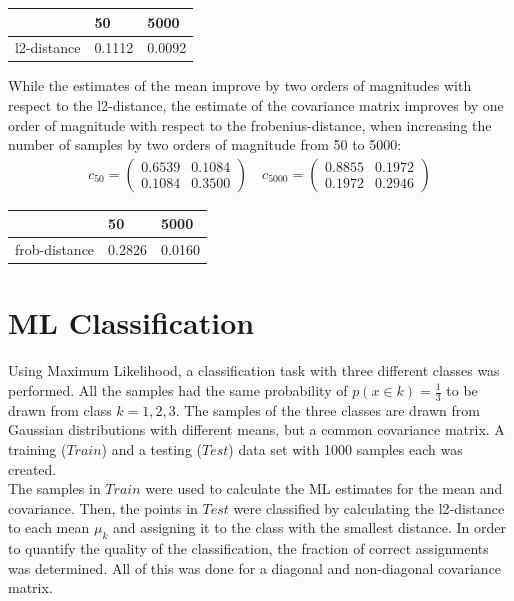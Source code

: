 \documentclass[DIV=12, ngerman, fontsize=12pt, parskip=half]{scrreprt}
\begin{document}
	\begin{table}[H]
	\begin{center}	
		\begin{tabular}{|l|l|l|}
			\hline
			& 50 & 5000 \\
			\hline
			l2-distance & 0.1112   & 0.0092   \\
			\hline
		\end{tabular}
	\end{center}
	\end{table}

	While the estimates of the mean improve by two orders of magnitudes with respect to the l2-distance, the estimate of the covariance matrix improves by one order of magnitude with respect to the frobenius-distance, when increasing the number of samples by two orders of magnitude from 50 to 5000:
	\begin{align*}
		c_{50} = \begin{pmatrix}			
					0.6539 & 0.1084\\
					0.1084 & 0.3500
				 \end{pmatrix}
		\quad 
		c_{5000} = \begin{pmatrix}			
					0.8855 & 0.1972\\
					0.1972 & 0.2946
					\end{pmatrix}
	\end{align*} 

	\begin{table}[H]
	\begin{center}	
		\begin{tabular}{|l|l|l|}
			\hline
			& 50 & 5000 \\
			\hline
			frob-distance & 0.2826   & 0.0160   \\
			\hline
		\end{tabular}
	\end{center}
	\end{table}
	
	
	\section{ML Classification}
	Using Maximum Likelihood, a classification task with three different classes was performed. All the samples had the same probability of $p(x \in k) = \frac{1}{3}$ to be drawn from class $k = 1,2,3$. The samples of the three classes are drawn from Gaussian distributions with different means, but a common covariance matrix. A training ($Train$) and a testing ($Test$) data set with 1000 samples each was created. \\
	 The samples in $Train$ were used to calculate the ML estimates for the mean and covariance. Then, the points in $Test$ were classified by calculating the l2-distance to each mean $\mu_k$ and assigning it to the class with the smallest distance. In order to quantify the quality of the classification, the fraction of correct assignments was determined. All of this was done for a diagonal and non-diagonal covariance matrix.
	
\end{document}
